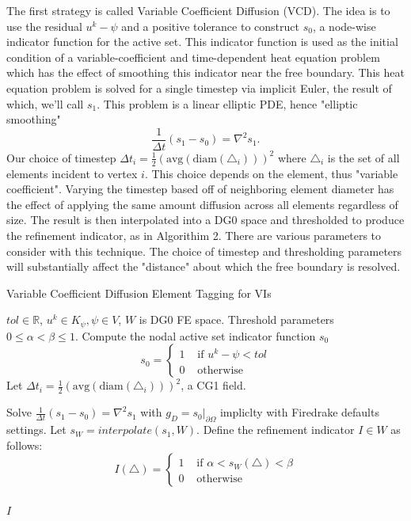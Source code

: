 \documentclass[]{interact}
\theoremstyle{plain}%
\theoremstyle{definition}
\theoremstyle{remark}
\begin{document}
The first strategy is called Variable Coefficient Diffusion (VCD). The idea is to use the residual $u^k - \psi$ and a positive tolerance to construct $s_0$, a node-wise indicator function for the active set. This indicator function is used as the initial condition of a variable-coefficient and time-dependent heat equation problem which has the effect of smoothing this indicator near the free boundary. This heat equation problem is solved for a single timestep via implicit Euler, the result of which, we'll call $s_1$. This problem is a linear elliptic PDE, hence "elliptic smoothing"
\begin{equation}
  \frac{1}{\Delta t}(s_1 - s_0) = \nabla^2 s_1.
\end{equation}
Our choice of timestep $\Delta t_i = \frac{1}{2}(\text{avg}(\text{diam}(\triangle_i)))^2$ where $\triangle_i$ is the set of all elements incident to vertex $i$. This choice depends on the element, thus "variable coefficient". Varying the timestep based off of neighboring element diameter has the effect of applying the same amount diffusion across all elements regardless of size. The result is then interpolated into a DG0 space and thresholded to produce the refinement indicator, as in Algorithim 2. There are various parameters to consider with this technique. The choice of timestep and thresholding parameters will substantially affect the "distance" about which the free boundary is resolved. 

\begin{algorithm}[H]
	\caption{Variable Coefficient Diffusion Element Tagging for VIs}\label{alg:cap}
	\begin{algorithmic}[1]
		\Require $tol \in \mathbb{R}$, $u^k \in K_\psi, \psi \in V$, $W$ is DG0 FE space.
		\Require Threshold parameters $0\leq \alpha < \beta \leq 1$.
		\State Compute the nodal active set indicator function $s_0$
		  \begin{equation*}
			s_0 = \begin{cases}
			  1 & \text{ if } u^k - \psi < tol\\
			  0 & \text{ otherwise}
			\end{cases}
		  \end{equation*}
		\State Let $\Delta t_i = \frac{1}{2}(\text{avg}(\text{diam}(\triangle_i)))^2$, a CG1 field.
	  
		\State Solve $\frac{1}{\Delta t}(s_1 - s_0) = \nabla^2 s_1$ with $g_D = s_0|_{\partial\Omega}$ impliclty with Firedrake defaults settings. 
		\State Let $s_W = interpolate(s_1, W)$.
		\State Define the refinement indicator $I \in W$ as follows:
		\begin{equation*}
		  I(\triangle) = \begin{cases}
			1 & \text{ if } \alpha < s_W(\triangle) < \beta\\
			0 & \text{ otherwise}
		  \end{cases}
		\end{equation*}\\
		\Return $I$
	\end{algorithmic}
	\end{algorithm}
\end{document}
